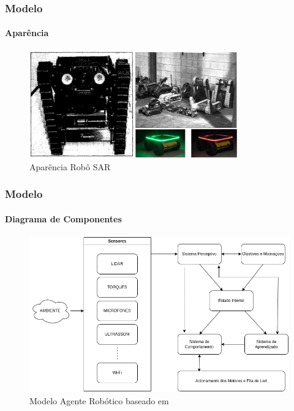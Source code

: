 \documentclass[aspectratio=169]{beamer}
\begin{document}
\begin{frame}
\frametitle{Modelo}
\framesubtitle{Aparência}
\begin{figure}
  \centering
  \includegraphics[width=0.8\textwidth]{robos-sar.png}
  \caption{Aparência Robô SAR}
\end{figure}


\end{frame}
\begin{frame}
\frametitle{Modelo}
\framesubtitle{Diagrama de Componentes}

\begin{figure}
  \centering
  \includegraphics[height=0.7\textheight]{modelo.png}
  \caption{Modelo Agente Robótico baseado em \cite{kim2002implementation}}
\end{figure}

\end{frame}
\end{document}
